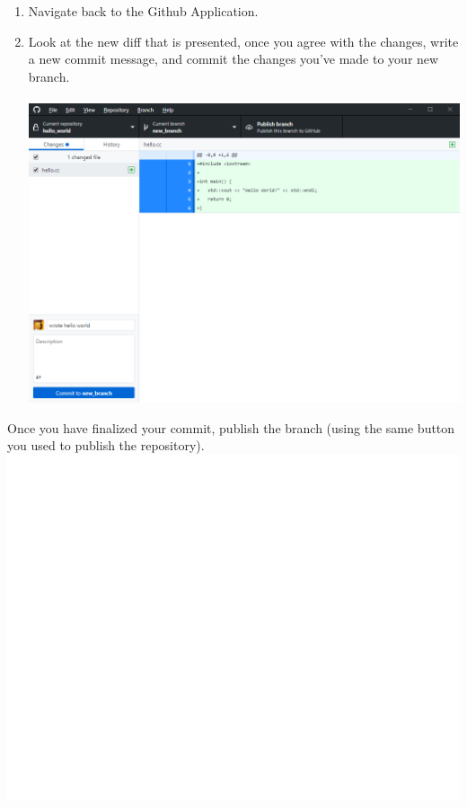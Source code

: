 \documentclass[12pt, letter]{article}
\begin{document}
    \begin{enumerate}
        \item Navigate back to the Github Application.

        \item Look at the new diff that is presented, once you agree with the changes, write a new commit message, and commit the changes you've made to your new branch. \\ \\ %
        \includegraphics{screenshots/shot8.bmp}
    \end{enumerate}
    Once you have finalized your commit, publish the branch (using the same button you used to publish the repository). \\

    \includegraphics{screenshots/shot08.bmp}
\end{document}
